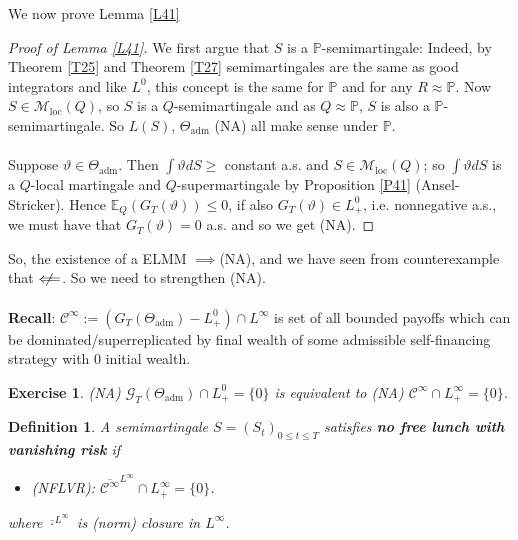 \documentclass[12pt,a4paper, twoside]{article}
\newtheorem{defn}{Definition}[section]
\newtheorem{exe}{Exercise}[section]
\theoremstyle{definition}
\newcommand{\EE}{\mathbb{E}} %
\newcommand{\PP}{\mathbb{P}} %
\begin{document}
We now prove Lemma \ref{L41}
\begin{proof}[Proof of Lemma \ref{L41}] We first argue that $S$ is a $\PP$-semimartingale: Indeed, by Theorem \ref{T25} and Theorem \ref{T27} semimartingales are the same as good integrators and like $L^0$, this concept is the same for $\PP$ and for any $R \approx \PP$. Now $S \in \mathcal{M}_\text{loc}(Q)$, so $S$ is a $Q$-semimartingale and as $Q \approx \PP$, $S$ is also a $\PP$-semimartingale. So $L(S)$, $\Theta_\text{adm}$ (NA) all make sense under $\PP$. 
\\\\
Suppose $\vartheta \in \Theta_\text{adm}$. Then $ \int \vartheta dS \geq$ constant a.s. and $S \in \mathcal{M}_\text{loc}(Q)$; so $\int \vartheta dS$ is a $Q$-local martingale and $Q$-supermartingale by Proposition \ref{P41} (Ansel-Stricker). Hence $\EE_Q(G_T( \vartheta)) \leq 0$, if also $G_T( \vartheta) \in L_+^0$, i.e. nonnegative a.s., we must have that $G_T( \vartheta)=0$ a.s. and so we get (NA).
\end{proof}
So, the existence of a ELMM $\implies $(NA), and we have seen from counterexample that $\centernot\Longleftarrow$. So we need to strengthen (NA). 
\\\\
\textbf{Recall}: $\mathcal{C}^\infty := ( G_T( \Theta_\text{adm})-L_+^0) \cap L^\infty$ is set of all bounded payoffs which can be dominated/superreplicated by final wealth of some admissible self-financing strategy with $0$ initial wealth. 
\begin{exe} \label{ex13} (NA) $\mathcal{G}_T( \Theta_\text{adm}) \cap L_+^0 = \{0\}$ is equivalent to (NA) $\mathcal{C}^\infty \cap L_+^\infty = \{0 \}$. 
\end{exe}
\begin{mdframed}[backgroundcolor=yellow!20, topline=true, linewidth=2.0pt]
\begin{defn}
A semimartingale $S=(S_t)_{0 \leq t \leq T}$ satisfies \textbf{no free lunch with vanishing risk} if 
\begin{itemize}
\item (NFLVR): $\overline{\mathcal{C}^\infty}^{L^\infty} \cap L_+^\infty = \{0 \}$. 
\end{itemize}
where $\overline{\cdot}^{L^\infty}$ is (norm) closure in $L^\infty$. 
\end{defn}
\end{mdframed}
\newpage
\end{document}

